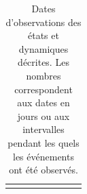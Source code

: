 {\tiny
\begin{longtable}{
	p{}%
 	p{}
 	p{}%
 	p{}
 	p{}%
 	p{}
 	p{}%
 	p{}}
 	
 	\caption{Dates d'observations des états et dynamiques
 	décrites. Les nombres correspondent aux dates en jours ou aux
 	intervalles pendant les quels les événements ont été
 	observés.}\label{tab:SP}\\
 	\hline
 	\endhead
 	
\hline
\endfoot


\end{longtable}}
